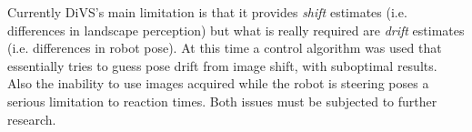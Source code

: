 \documentclass[twocolumn, 9pt,fleqn]{jsproceedings}
\begin{document}
Currently DiVS's main limitation is that it provides \textit{shift} estimates (i.e. differences in landscape perception) but what is really required are \textit{drift} estimates (i.e. differences in robot pose). At this time a control algorithm was used that essentially tries to guess pose drift from image shift, with suboptimal results. Also the inability to use images acquired while the robot is steering poses a serious limitation to reaction times. Both issues must be subjected to further research.

\footnotesize




\normalsize
\end{document}
